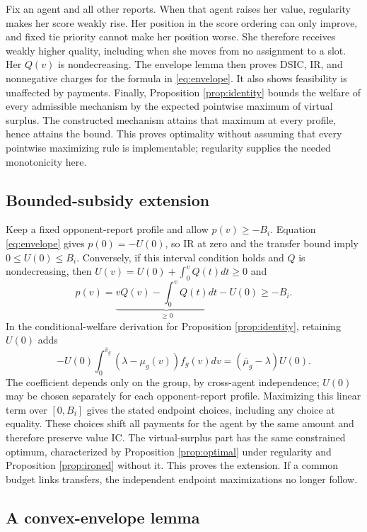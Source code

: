 \documentclass[11pt]{article}
\begin{document}
Fix an agent and all other reports. When that agent raises her value, regularity makes her score weakly rise. Her position in the score ordering can only improve, and fixed tie priority cannot make her position worse. She therefore receives weakly higher quality, including when she moves from no assignment to a slot. Her $Q(v)$ is nondecreasing. The envelope lemma then proves DSIC, IR, and nonnegative charges for the formula in \eqref{eq:envelope}. It also shows feasibility is unaffected by payments. Finally, Proposition \ref{prop:identity} bounds the welfare of every admissible mechanism by the expected pointwise maximum of virtual surplus. The constructed mechanism attains that maximum at every profile, hence attains the bound. This proves optimality without assuming that every pointwise maximizing rule is implementable; regularity supplies the needed monotonicity here.

\subsection{Bounded-subsidy extension}\label{app:subsidy}

Keep a fixed opponent-report profile and allow $p(v)\ge-B_i$. Equation \eqref{eq:envelope} gives $p(0)=-U(0)$, so IR at zero and the transfer bound imply $0\le U(0)\le B_i$. Conversely, if this interval condition holds and $Q$ is nondecreasing, then $U(v)=U(0)+\int_0^vQ(t)dt\ge0$ and
\[
p(v)=\underbrace{vQ(v)-\int_0^vQ(t)dt}_{\ge0}-U(0)\ge-B_i.
\]
In the conditional-welfare derivation for Proposition \ref{prop:identity}, retaining $U(0)$ adds
\[
-U(0)\int_0^{\bar v_g}(\lambda-\mu_g(v))f_g(v)dv
=(\bar\mu_g-\lambda)U(0).
\]
The coefficient depends only on the group, by cross-agent independence; $U(0)$ may be chosen separately for each opponent-report profile. Maximizing this linear term over $[0,B_i]$ gives the stated endpoint choices, including any choice at equality. These choices shift all payments for the agent by the same amount and therefore preserve value IC. The virtual-surplus part has the same constrained optimum, characterized by Proposition \ref{prop:optimal} under regularity and Proposition \ref{prop:ironed} without it. This proves the extension. If a common budget links transfers, the independent endpoint maximizations no longer follow.

\subsection{A convex-envelope lemma}\label{app:convex}
\end{document}
